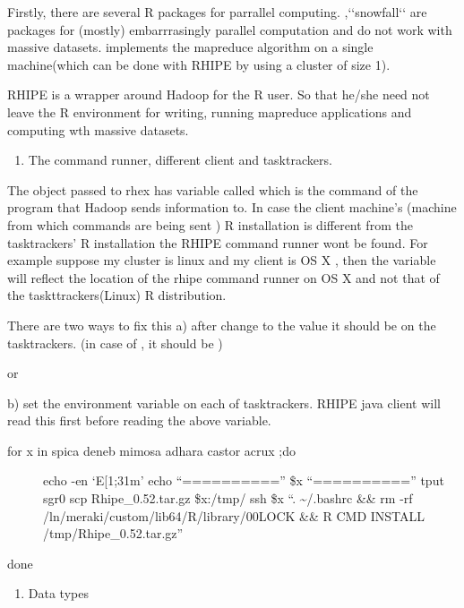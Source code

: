 \documentclass[letterpaper,10pt,english]{manual}
\begin{document}
Firstly, there are several R packages for parrallel computing. ,{}`{}`snowfall{}`{}`
are packages for (mostly) embarrrasingly parallel computation and do not work
with massive datasets.  implements the mapreduce algorithm on a
single machine(which can be done with RHIPE by using a cluster of size 1).

RHIPE is a wrapper around Hadoop for the R user. So that he/she need not leave
the R environment for writing, running mapreduce applications and computing wth
massive datasets.
\begin{enumerate}
\item {} 
The command runner, different client and tasktrackers.

\end{enumerate}

The object passed to rhex has variable called  which is the
command of the program that Hadoop sends information to. In case the client
machine's (machine from which commands are being sent ) R installation is different from the
tasktrackers' R installation the RHIPE command runner wont be found. For example
suppose my cluster is linux and my client is OS X , then the 
variable will reflect the location of the rhipe command runner on OS X and not
that of the taskttrackers(Linux) R distribution.

There are two ways to fix this
a) after  change  to the
value it should be on the tasktrackers.
(in case of , it should be )

or

b) set the environment variable  on each of tasktrackers. RHIPE
java client will read this first before reading the above variable.
\begin{description}
\item[for x in spica deneb mimosa adhara castor acrux ;do]
echo -en `E{[}1;31m'
echo ``=========='' \$x ``==========''
tput sgr0
scp Rhipe\_0.52.tar.gz \$x:/tmp/
ssh \$x ``. \textasciitilde{}/.bashrc \&\& rm -rf /ln/meraki/custom/lib64/R/library/00LOCK \&\& R CMD INSTALL /tmp/Rhipe\_0.52.tar.gz''

\end{description}

done
\begin{enumerate}
\item {} 
Data types

\end{enumerate}
\end{document}
